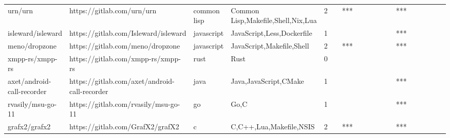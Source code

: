 \begin{tabular}{llllrlllllllllllll}
urn/urn                                            &                         https://gitlab.com/urn/urn &       common lisp &                 Common Lisp,Makefile,Shell,Nix,Lua &       2 &         &    *** &           &                &                 &        &           &       *** &          &          &       &              &          \\
isleward/isleward                                  &               https://gitlab.com/Isleward/isleward &        javascript &                         JavaScript,Less,Dockerfile &       1 &         &        &           &                &                 &        &           &       *** &          &          &       &              &          \\
meno/dropzone                                      &                   https://gitlab.com/meno/dropzone &        javascript &                          JavaScript,Makefile,Shell &       2 &         &    *** &           &                &                 &        &           &       *** &          &          &       &              &          \\
xmpp-rs/xmpp-rs                                    &                 https://gitlab.com/xmpp-rs/xmpp-rs &              rust &                                               Rust &       0 &         &        &           &                &                 &        &           &           &          &          &       &              &          \\
axet/android-call-recorder                         &      https://gitlab.com/axet/android-call-recorder &              java &                              Java,JavaScript,CMake &       1 &         &        &           &                &                 &        &           &       *** &          &          &       &              &          \\
rvasily/msu-go-11                                  &               https://gitlab.com/rvasily/msu-go-11 &                go &                                               Go,C &       1 &         &        &           &                &                 &        &           &       *** &          &          &       &              &          \\
grafx2/grafx2                                      &                   https://gitlab.com/GrafX2/grafX2 &                 c &                            C,C++,Lua,Makefile,NSIS &       2 &         &    *** &           &                &                 &        &           &       *** &          &          &       &              &          \\

\end{tabular}
